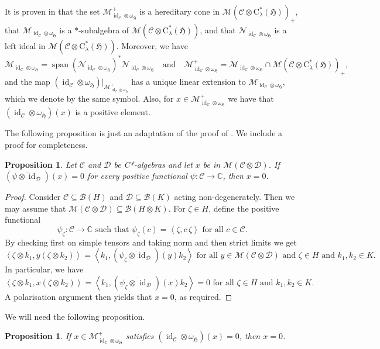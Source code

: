 \documentclass[11pt,final]{amsart}
\numberwithin{equation}{section}
\theoremstyle{plain}
\newtheorem{proposition}[theorem]{Proposition}
\theoremstyle{definition}
\theoremstyle{remark}
\newcommand{\B}{{\mathcal{B}}}
\newcommand{\C}{{\mathcal{C}}}
\newcommand{\D}{{\mathcal{D}}}
\newcommand{\M}{{\mathcal{M}}}
\newcommand{\N}{{\mathcal{N}}}
\def\ze{\zeta}
\def\la{\lambda}
\def\om{\omega}
\newcommand{\bC}{\mathbb{C}}
\newcommand{\fH}{{\mathfrak{H}}}
\newcommand{\foral}{\text{ for all }}
\newcommand{\qand}{\quad\text{and}\quad}
\newcommand{\ca}{\mathrm{C}^*}
\newcommand{\ol}{\overline}
\newcommand{\id}{{\operatorname{id}}}
\newcommand{\spn}{\operatorname{span}}
\newcommand{\sca}[1]{\left\langle#1\right\rangle} %
\begin{document}
It is proven in \cite[Result 3.6 and Notation 3.7]{KV99}  that the set $\M_{\id_{\C}\otimes \om_{\fH}}^+$ is a hereditary cone in $\M(\C\otimes \ca_\la(\fH))_+$, that $\M_{\id_{\C}\otimes \om_{\fH}}$ is a $*$-subalgebra of $\M(\C\otimes \ca_\la(\fH))$, and that $\N_{\id_{\C}\otimes \om_{\fH}}$ is a left ideal in $\M(\C\otimes \ca_\la(\fH))$. Moreover, we have
\[
\M_{\id_{\C}\otimes \om_{\fH}}=\spn (\N_{\id_{\C}\otimes \om_{\fH}})^* \N_{\id_{\C}\otimes \om_{\fH}}
\qand
\M_{\id_{\C}\otimes \om_{\fH}}^+= \M_{\id_{\C}\otimes \om_{\fH}} \cap \M(\C\otimes \ca_\la(\fH))_+,
\]
and the map $(\id_{\C}\otimes \om_{\fH})|_{\M_{\id_\C\otimes \om_{\fH}}^+}$ has a unique linear extension to $\M_{\id_{\C}\otimes \om_{\fH}}$, which we denote by the same symbol.
Also, for $x\in \M_{\id_{\C}\otimes \om_{\fH}}^+$ we have that $(\id_{\C}\otimes \om_{\fH})(x)$ is a positive element.

The following proposition is just an adaptation of the proof of \cite[Lemma~A.30]{EKQR06}. We include a proof for completeness.

\begin{proposition}\label{P:posslic}\cite[Lemma~A.30]{EKQR06}
Let $\C$ and $\D$ be C*-algebras and let $x$ be in $\M(\C\otimes \D)$. If $(\ol{\psi \otimes \id_{\D}})(x)=0$ for every positive functional $\psi \colon \C \to \bC$, then $x=0$.
\end{proposition}

\begin{proof}
Consider $\C \subseteq \B(H)$ and $\D \subseteq \B(K)$ acting non-degenerately. Then we may assume that $\M(\C\otimes \D) \subseteq \B(H\otimes K)$.
For $\ze\in H$, define the positive functional
\[
\psi_\ze \colon \C \to \bC \text{ such that } \psi_\ze(c)=\sca{\ze,c \, \ze}
\foral c\in \C.
\]
By checking first on simple tensors and taking norm and then strict limits we get
\[
\sca{\ze\otimes k_1,y(\ze\otimes k_2)}
=
\sca{k_1,(\ol{\psi_{\ze} \otimes \id_{\D}})(y) k_2} \foral y\in \M(\C\otimes\D) \text{ and } \ze \in H \text{ and } k_1,k_2 \in K.
\]
In particular, we have
\[
\sca{\ze\otimes k_1,x (\ze\otimes k_2)}
=
\sca{k_1,(\ol{\psi_{\ze} \otimes \id_{\D}})(x) k_2}
=0
\foral \ze\in H \text{ and } k_1,k_2\in K.
\]
A polarisation argument then yields that $x=0$, as required.
\end{proof}

We will need the following proposition.

\begin{proposition}\label{P:faithslice}
If $x\in \M_{\id_{\C}\otimes \om_{\fH}}^+$ satisfies $(\id_{\C}\otimes \om_{\fH})(x)=0$, then $x=0$. 
\end{proposition}
\end{document}
